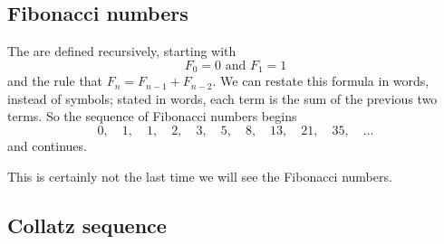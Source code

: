 \subsection{Fibonacci numbers}


The  are defined recursively, starting with
$$
F_0 = 0 \mbox{ and } F_1 = 1
$$
and the rule that $F_{n} = F_{n-1} + F_{n-2}$.  We can restate this
formula in words, instead of symbols; stated in words, each term is
the sum of the previous two terms.  So the sequence of Fibonacci
numbers begins 
$$
0, \quad 1, \quad 1, \quad 2, \quad 3, \quad 5, \quad 8, \quad 13, \quad 21, \quad 35, \quad\ldots
$$
and continues.

This is certainly not the last time we will see the Fibonacci numbers.

\subsection{Collatz sequence}

